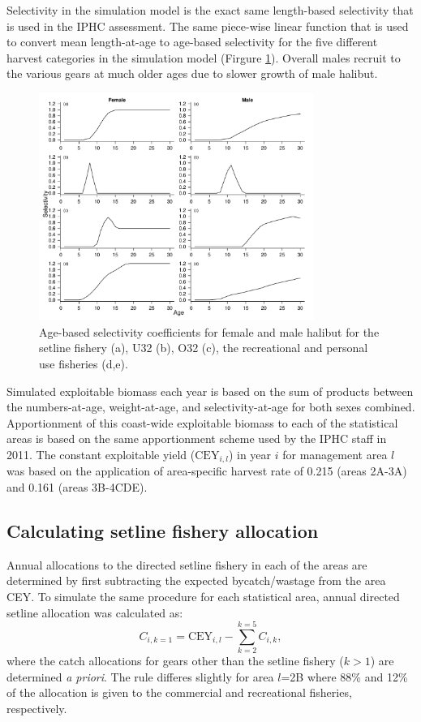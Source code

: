 Selectivity in the simulation model is the exact same length-based selectivity that is used in the IPHC assessment.  The same piece-wise linear function that is used to convert mean length-at-age to age-based selectivity for the five different harvest categories in the simulation model (Firgure \ref{fig:FIGURES_fig:AgeSel}).  Overall males recruit to the various gears at much older ages due to slower growth of male halibut.
\begin{figure}[htbp]
	\centering
		\includegraphics[width=0.8\textwidth]{../FIGURES/fig:AgeSel.pdf}
	\caption{Age-based selectivity coefficients for female and male halibut for the setline fishery (a), U32 (b), O32 (c), the recreational and personal use fisheries (d,e).}
	\label{fig:FIGURES_fig:AgeSel}
\end{figure}

Simulated exploitable biomass each year is based on the sum of products between the numbers-at-age,  weight-at-age, and selectivity-at-age for both sexes combined.  Apportionment of this coast-wide exploitable biomass to each of the statistical areas is based on the same apportionment scheme used by the IPHC staff in 2011.  The constant exploitable yield ($\mathrm{CEY}_{i,l}$) in year $i$ for  management area $l$ was based on the application of area-specific harvest rate of 0.215 (areas 2A-3A) and 0.161 (areas 3B-4CDE).
\subsection{Calculating setline fishery allocation} %
\label{sub:calculating_setline_fishery_allocation}
Annual allocations to the directed setline fishery in each of the areas are determined by first subtracting the expected bycatch/wastage from the area CEY.  To simulate the same procedure for each statistical area, annual directed setline allocation was calculated as:
\[ C_{i,k=1} = \mathrm{CEY}_{i,l} - \sum_{k=2}^{k=5} C_{i,k}, \]
where the catch allocations for gears other than the setline fishery ($k>1$) are determined \emph{a priori}.  The rule differes slightly for area $l$=2B where 88\% and 12\% of the allocation is given to the commercial and recreational fisheries, respectively.


